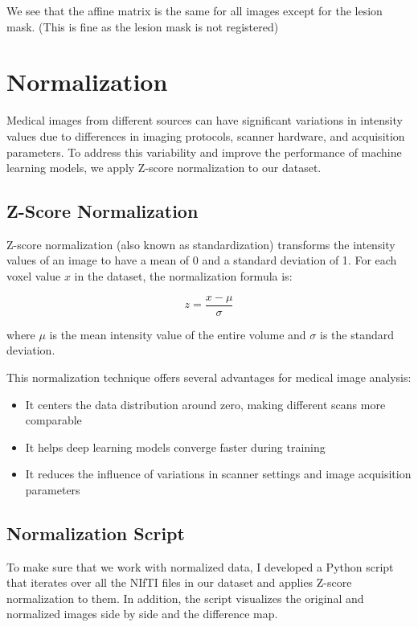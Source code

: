 We see that the affine matrix is the same for all images except for the lesion mask. (This is fine as the lesion mask is not registered)

\section{Normalization}
\label{sec:normalization}

Medical images from different sources can have significant variations in intensity values due to differences in imaging protocols, scanner hardware, and acquisition parameters. To address this variability and improve the performance of machine learning models, we apply Z-score normalization to our dataset.

\subsection{Z-Score Normalization}
\label{subsec:z_score_normalization}

Z-score normalization (also known as standardization) transforms the intensity values of an image to have a mean of 0 and a standard deviation of 1. For each voxel value $x$ in the dataset, the normalization formula is:

\begin{equation}
z = \frac{x - \mu}{\sigma}
\end{equation}

where $\mu$ is the mean intensity value of the entire volume and $\sigma$ is the standard deviation.

This normalization technique offers several advantages for medical image analysis:
\begin{itemize}
    \item It centers the data distribution around zero, making different scans more comparable
    \item It helps deep learning models converge faster during training
    \item It reduces the influence of variations in scanner settings and image acquisition parameters
\end{itemize}

\subsection{Normalization Script}
\label{subsec:normalization_implementation}

To make sure that we work with normalized data, I developed a Python script that iterates over all the NIfTI files in our dataset and applies Z-score normalization to them. In addition, the script visualizes the original and normalized images side by side and the difference map.


